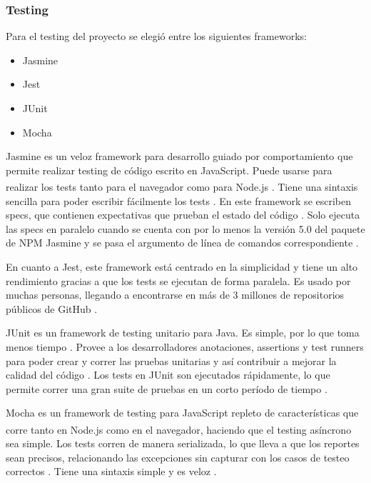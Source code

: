 \documentclass[twoside]{article}
\begin{document}
\subsubsection{Testing}
Para el testing del proyecto se elegió entre los siguientes frameworks:
\begin{itemize}
    \item Jasmine
    \item Jest
    \item JUnit
    \item Mocha
\end{itemize}
Jasmine es un veloz framework para desarrollo guiado por comportamiento que permite realizar testing de código escrito en JavaScript. Puede usarse para realizar los tests tanto para el navegador como para Node.js \textsuperscript{\textregistered}. Tiene una sintaxis sencilla para poder escribir fácilmente los tests \parencite{jasmineOfficialHome}. En este framework se escriben specs, que contienen expectativas que prueban el estado del código \parencite{jasmineYourFirstSuite}. Solo ejecuta las specs en paralelo cuando se cuenta con por lo menos la versión 5.0 del paquete de NPM Jasmine y se pasa el argumento de línea de comandos correspondiente \parencite{jasmineFrequentlyAskedQuestions}. 

En cuanto a Jest, este framework está centrado en la simplicidad y tiene un alto rendimiento gracias a que los tests se ejecutan de forma paralela. Es usado por muchas personas, llegando a encontrarse en más de 3 millones de repositorios públicos de GitHub \parencite{jestOfficial}.

JUnit es un framework de testing unitario para Java. Es simple, por lo que toma menos tiempo \parencite{tutorialsPointJUnit}. Provee a los desarrolladores anotaciones, assertions y test runners para poder crear y correr las pruebas unitarias y así contribuir a mejorar la calidad del código \parencite{simplilearnJUnit}. Los tests en JUnit son ejecutados rápidamente, lo que permite correr una gran suite de pruebas en un corto período de tiempo \parencite{codeIntelligenceJUnit}.

Mocha es un framework de testing para JavaScript repleto de características que corre tanto en Node.js\textsuperscript{\textregistered} como en el navegador, haciendo que el testing asíncrono sea simple. Los tests corren de manera serializada, lo que lleva a que los reportes sean precisos, relacionando las excepciones sin capturar con los casos de testeo correctos \parencite{mochaHome}. Tiene una sintaxis simple y es veloz \parencite{mindkTesting}.
\end{document}
